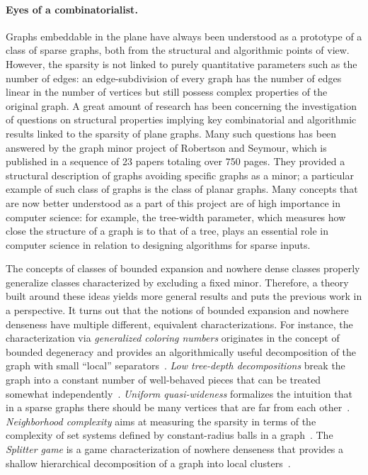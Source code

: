 \paragraph*{Eyes of a combinatorialist.}
Graphs embeddable in the plane have always been understood as a prototype of a class of sparse graphs,
both from the structural and algorithmic points of view.
However, the sparsity is not linked to purely quantitative parameters such as the number of edges:
an edge-subdivision of every graph has the number of edges linear in the number of vertices
but still possess complex properties of the original graph.
A great amount of research has been concerning the investigation of questions on structural properties
implying key combinatorial and algorithmic results linked to the sparsity of plane graphs.
Many such questions has been answered by the graph minor project of Robertson and Seymour,
which is published in a sequence of 23 papers totaling over 750 pages.
They provided a structural description of graphs avoiding specific graphs as a minor;
a particular example of such class of graphs is the class of planar graphs.
Many concepts that are now better understood as a part of this project are of high importance in computer science:
for example, the tree-width parameter, which measures how close the structure of a graph is to that of a tree,
plays an essential role in computer science in relation to designing algorithms for sparse inputs.

The concepts of classes of bounded expansion and nowhere dense classes properly generalize classes characterized by excluding a fixed minor.
Therefore, a theory built around these ideas yields more general results and puts the previous work in a perspective.
It turns out that the notions of bounded expansion and nowhere denseness have multiple different, equivalent characterizations.
For instance, the characterization via {\em{generalized coloring numbers}} originates in the concept of bounded degeneracy and provides an algorithmically useful decomposition of the graph with small ``local''
separators~\cite{Zhu09}.
{\em{Low tree-depth decompositions}} break the graph into a constant number of well-behaved pieces that can be treated somewhat independently~\cite{NesetrilM08a}.
{\em{Uniform quasi-wideness}} formalizes the intuition that in a sparse graphs there should be many vertices that are far from each other~\cite{nevsetvril2010first}.
{\em{Neighborhood complexity}} aims at measuring the sparsity in terms of the complexity of set systems defined by constant-radius balls in a graph~\cite{ReidlVS19}.
The {\em{Splitter game}} is a game characterization of nowhere denseness that provides a shallow hierarchical decomposition of a graph into local clusters~\cite{grohe2017deciding}.

